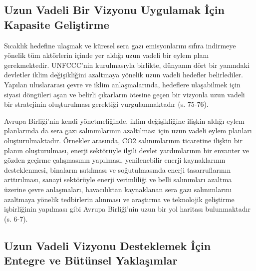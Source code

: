 \documentclass[
]{book}
\begin{document}
\hypertarget{uzun-vadeli-bir-vizyonu-uygulamak-iuxe7in-kapasite-geliux15ftirme}{%
\subsection{Uzun Vadeli Bir Vizyonu Uygulamak İçin Kapasite Geliştirme}\label{uzun-vadeli-bir-vizyonu-uygulamak-iuxe7in-kapasite-geliux15ftirme}}

Sıcaklık hedefine ulaşmak ve küresel sera gazı emisyonlarını sıfıra indirmeye yönelik tüm aktörlerin içinde yer aldığı uzun vadeli bir eylem planı gerekmektedir. UNFCCC'nin kurulmasıyla birlikte, dünyanın dört bir yanındaki devletler iklim değişikliğini azaltmaya yönelik uzun vadeli hedefler belirlediler. Yapılan uluslararası çevre ve iklim anlaşmalarında, hedeflere ulaşabilmek için siyasi döngüleri aşan ve belirli çıkarların ötesine geçen bir vizyonla uzun vadeli bir stratejinin oluşturulması gerektiği vurgulanmaktadır (s. 75-76). \citep{ponthieu2019climate}

Avrupa Birliği'nin kendi yönetmeliğinde, iklim değişikliğine ilişkin aldığı eylem planlarında da sera gazı salınımlarının azaltılması için uzun vadeli eylem planları oluşturulmaktadır. Örnekler arasında, CO2 salınımlarının ticaretine ilişkin bir planın oluşturulması, enerji sektörüyle ilgili devlet yardımlarının bir envanter ve gözden geçirme çalışmasının yapılması, yenilenebilir enerji kaynaklarının desteklenmesi, binaların ısıtılması ve soğutulmasında enerji tasarruflarının arttırılması, sanayi sektörüyle enerji verimliliği ve belli salınımları azaltma üzerine çevre anlaşmaları, havacılıktan kaynaklanan sera gazı salınımlarını azaltmaya yönelik tedbirlerin alınması ve araştırma ve teknolojik geliştirme işbirliğinin yapılması gibi Avrupa Birliği'nin uzun bir yol haritası bulunmaktadır (s. 6-7). \citep{turkes2004avrupa}

\hypertarget{uzun-vadeli-vizyonu-desteklemek-iuxe7in-entegre-ve-buxfctuxfcnsel-yaklaux15fux131mlar}{%
\subsection{Uzun Vadeli Vizyonu Desteklemek İçin Entegre ve Bütünsel Yaklaşımlar}\label{uzun-vadeli-vizyonu-desteklemek-iuxe7in-entegre-ve-buxfctuxfcnsel-yaklaux15fux131mlar}}
\end{document}
